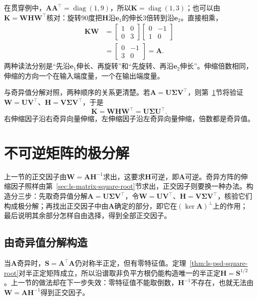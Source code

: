 在贯穿例中，$\bm A\bm A^\top=\operatorname{diag}(1,9)$，所以$\bm K=\operatorname{diag}(1,3)$；也可以由$\bm K=\bm W\bm H\bm W^\top$核对：旋转$90$度把$\bm H$沿$\bm e_1$的伸长$3$倍转到沿$\bm e_2$。直接相乘，
\[
 \begin{aligned}
 \bm K\bm W&=\begin{bmatrix}1&0\\0&3\end{bmatrix}\begin{bmatrix}0&-1\\1&0\end{bmatrix}\\
 &=\begin{bmatrix}0&-1\\3&0\end{bmatrix}=\bm A .
 \end{aligned}
\]
两种读法分别是“先沿$\bm e_1$伸长、再旋转”和“先旋转、再沿$\bm e_2$伸长”。伸缩倍数相同，伸缩的方向一个在输入端度量，一个在输出端度量。

与奇异值分解对照，两种顺序的关系更清楚。若$\bm A=\bm U\bm\Sigma\bm V^\top$，则第~\ref{sec:ls-polar-singular-best-orthogonal}节将验证$\bm W=\bm U\bm V^\top$、$\bm H=\bm V\bm\Sigma\bm V^\top$，于是
\[
 \bm K=\bm W\bm H\bm W^\top=\bm U\bm\Sigma\bm U^\top .
\]右伸缩因子沿右奇异向量伸缩，左伸缩因子沿左奇异向量伸缩，倍数都是奇异值。

\section{不可逆矩阵的极分解}
\label{sec:ls-polar-singular-best-orthogonal}

上一节的正交因子由$\bm W=\bm A\bm H^{-1}$求出，这要求$\bm H$可逆，即$\bm A$可逆。奇异方阵的伸缩因子照样由第~\ref{sec:ls-matrix-square-root}节求出，正交因子则要换一种办法。构造分三步：先取奇异值分解$\bm A=\bm U\bm\Sigma\bm V^\top$，令$\bm W=\bm U\bm V^\top$、$\bm H=\bm V\bm\Sigma\bm V^\top$，核验它们构成极分解；再找出正交因子中由$\bm A$确定的部分，即它在$(\ker\bm A)^\perp$上的作用；最后说明其余部分怎样自由选择，得到全部正交因子。

\subsection{由奇异值分解构造}
\label{sec:ls-polar-singular-construction}

当$\bm A$奇异时，$\bm S=\bm A^\top\bm A$仍对称半正定，但有零特征值。定理~\ref{thm:ls-psd-square-root}对半正定矩阵成立，所以沿谱取非负平方根仍能构造唯一的半正定$\bm H=\bm S^{1/2}$。上一节的做法却在下一步失效：零特征值不能取倒数，$\bm H^{-1}$不存在，也就无法由$\bm W=\bm A\bm H^{-1}$得到正交因子。

